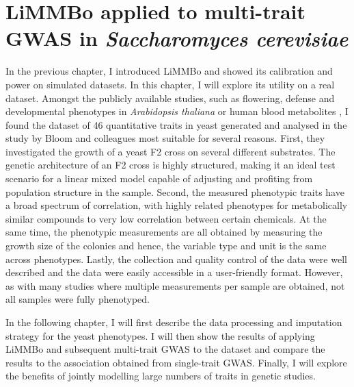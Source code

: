 \chapter{LiMMBo applied to multi-trait GWAS  in \emph{Saccharomyces cerevisiae}}
\label{chapter:yeast}
In the previous chapter, I introduced LiMMBo and showed its calibration and power on simulated datasets. In this chapter, I will explore its utility on a real dataset. Amongst the publicly available studies, such as flowering, defense and developmental phenotypes in \textit{Arabidopsis thaliana} \citep{Atwell2010} or human blood metabolites \citep{Shin2014}, I found the dataset of 46 quantitative traits in yeast generated and analysed in the study by Bloom and colleagues \citep{Bloom2013} most suitable for several reasons. First, they investigated the growth of a yeast F2 cross on several different substrates.  The genetic architecture of an F2 cross is highly structured, making it an ideal test scenario for a linear mixed model capable of adjusting and profiting from population structure in the sample. Second, the measured phenotypic traits have a broad spectrum of correlation, with highly related phenotypes for metabolically similar compounds to very low correlation between certain chemicals. At the same time, the phenotypic measurements are all obtained by measuring the growth size of the colonies and hence, the variable type and unit is the same across phenotypes. Lastly, the collection and quality control of the data were well described and the data were easily accessible in a user-friendly format. However, as with many studies where multiple measurements per sample are obtained, not all samples were fully phenotyped. 

In the following chapter, I will first describe the data processing and imputation strategy for the yeast phenotypes. I will then show the results of applying LiMMBo and subsequent multi-trait GWAS to the dataset and compare the results to the association obtained from single-trait GWAS. Finally, I will explore the benefits of jointly modelling large numbers of traits in genetic studies.

